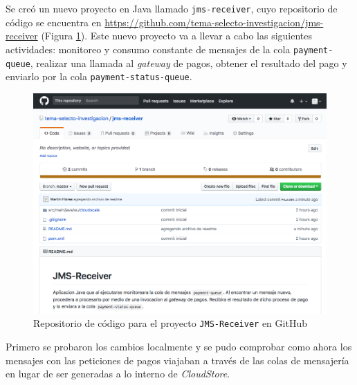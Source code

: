 \documentclass[11pt, twoside]{report}
\begin{document}
Se creó un nuevo proyecto en Java llamado \texttt{jms-receiver}, cuyo repositorio de código se encuentra en \url{https://github.com/tema-selecto-investigacion/jms-receiver} (Figura \ref{fig:github-jms-receiver}). Este nuevo proyecto va a llevar a cabo las siguientes actividades: monitoreo y consumo constante de mensajes de la cola \texttt{payment-queue}, realizar una llamada al \emph{gateway} de pagos, obtener el resultado del pago y enviarlo por la cola \texttt{payment-status-queue}.

\begin{figure}[h]
  \centering
  \includegraphics[width=15cm]{github-jms-receiver}
  \caption{\small{Repositorio de código para el proyecto \texttt{JMS-Receiver} en GitHub}}
  \label{fig:github-jms-receiver}
\end{figure}

Primero se probaron los cambios localmente y se pudo comprobar como ahora los mensajes con las peticiones de pagos viajaban a través de las colas de mensajería en lugar de ser generadas a lo interno de \emph{CloudStore}.
\end{document}
